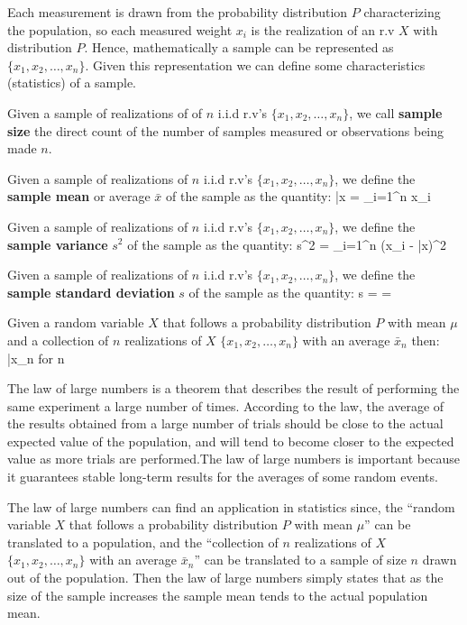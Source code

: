 Each measurement is drawn from the probability distribution $P$ characterizing the population, so each measured
weight $x_{i}$ is the realization of an r.v $X$ with distribution $P$. Hence, mathematically a sample can be
represented as $\{ x_{1}, x_{2}, \ldots, x_{n} \}$. Given this representation we can define some characteristics
(statistics) of a sample.

Given a sample of realizations of of $n$ i.i.d r.v's $\{ x_{1}, x_{2}, \ldots, x_{n} \}$, we call \textbf{sample
size} the direct count of the number of samples measured or observations being made $n$.
\ed

Given a sample of realizations of $n$ i.i.d r.v's $\{ x_{1}, x_{2}, \ldots, x_{n} \}$, we define the \textbf{sample
mean} or average $\bar{x}$ of the sample as the quantity:
\bse
\bar{x} =  \sum_{i=1}^{n} x_{i}
\ese
\ed

Given a sample of realizations of $n$ i.i.d r.v's $\{ x_{1}, x_{2}, \ldots, x_{n} \}$, we define the \textbf{sample
variance} $s^2$ of the sample as the quantity:
\bse
s^2 =  \sum_{i=1}^{n} (x_{i} - \bar{x})^2
\ese
\ed

Given a sample of realizations of $n$ i.i.d r.v's $\{ x_{1}, x_{2}, \ldots, x_{n} \}$, we define the \textbf{sample
standard deviation} $s$ of the sample as the quantity:
\bse
s =  = 
\ese
\ed

Given a random variable $X$ that follows a probability distribution $P$ with mean $\mu$ and a collection of $n$
realizations of $X$ $\{ x_{1}, x_{2}, \ldots, x_{n} \}$ with an average $\bar{x}_{n}$ then:
\bse
\bar{x}_{n} \to \mu \:\:\: for \:\:\: n \to \infty
\ese
\et

The law of large numbers is a theorem that describes the result of performing the same experiment a large number of
times. According to the law, the average of the results obtained from a large number of trials should be close to the
actual expected value of the population, and will tend to become closer to the expected value as more trials are
performed.The law of large numbers is important because it guarantees stable long-term results for the averages of
some random events.


The law of large numbers can find an application in statistics since, the ``random variable $X$ that follows a
probability distribution $P$ with mean $\mu$'' can be translated to a population, and the ``collection of $n$
realizations of $X$ $\{ x_{1}, x_{2}, \ldots, x_{n} \}$ with an average $\bar{x}_{n}$'' can be translated to a sample of
size $n$ drawn out of the population. Then the law of large numbers simply states that as the size of the sample
increases the sample mean tends to the actual population mean.

